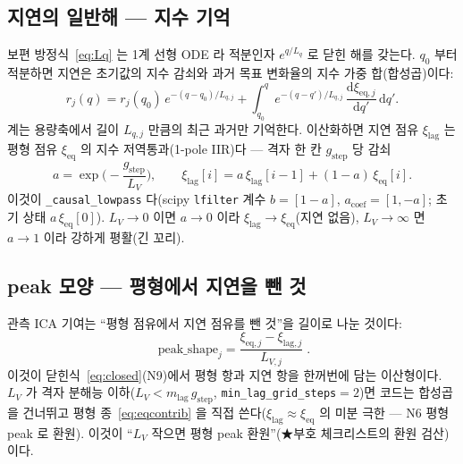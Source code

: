 \documentclass[11pt,a4paper]{article}
\newcommand{\dd}{\mathrm{d}}
\newcommand{\eq}{\mathrm{eq}}
\newcommand{\lag}{\mathrm{lag}}
\newcommand{\code}[1]{\texttt{#1}}
\begin{document}
\subsection{지연의 일반해 — 지수 기억}
보편 방정식~\eqref{eq:Lq} 는 1계 선형 ODE 라 적분인자 $e^{q/L_q}$ 로 닫힌 해를 갖는다. $q_0$ 부터 적분하면 지연은 초기값의 지수 감쇠와 과거 목표 변화율의 지수 가중 합(합성곱)이다:
\begin{equation}
r_j(q)=r_j(q_0)\,e^{-(q-q_0)/L_{q,j}}+\int_{q_0}^{q}e^{-(q-q')/L_{q,j}}\,\frac{\dd\xi_{\eq,j}}{\dd q'}\,\dd q'.
\label{eq:memory}
\end{equation}
계는 용량축에서 길이 $L_{q,j}$ 만큼의 최근 과거만 기억한다. 이산화하면 지연 점유 $\xi_\lag$ 는 평형 점유 $\xi_\eq$ 의 지수 저역통과(1-pole IIR)다 — 격자 한 칸 $g_\mathrm{step}$ 당 감쇠
\begin{equation}
a=\exp\!\Big(-\frac{g_\mathrm{step}}{L_V}\Big),\qquad
\xi_\lag[i]=a\,\xi_\lag[i-1]+(1-a)\,\xi_\eq[i].
\label{eq:lowpass}
\end{equation}
이것이 \code{\_causal\_lowpass} 다(scipy \code{lfilter} 계수 $b=[1-a]$, $a_\mathrm{coef}=[1,-a]$; 초기 상태 $a\,\xi_\eq[0]$). $L_V\to0$ 이면 $a\to0$ 이라 $\xi_\lag\to\xi_\eq$(지연 없음), $L_V\to\infty$ 면 $a\to1$ 이라 강하게 평활(긴 꼬리).

\subsection{peak 모양 — 평형에서 지연을 뺀 것}
관측 ICA 기여는 ``평형 점유에서 지연 점유를 뺀 것''을 길이로 나눈 것이다:
\begin{equation}
\boxed{\;\text{peak\_shape}_j=\frac{\xi_{\eq,j}-\xi_{\lag,j}}{L_{V,j}}\;.}
\label{eq:peakshape}
\end{equation}
이것이 닫힌식~\eqref{eq:closed}(N9)에서 평형 항과 지연 항을 한꺼번에 담는 이산형이다. $L_V$ 가 격자 분해능 이하($L_V<m_\lag\,g_\mathrm{step}$, \code{min\_lag\_grid\_steps}$=2$)면 코드는 합성곱을 건너뛰고 평형 종~\eqref{eq:eqcontrib} 을 직접 쓴다($\xi_\lag\approx\xi_\eq$ 의 미분 극한 — N6 평형 peak 로 환원). 이것이 ``$L_V$ 작으면 평형 peak 환원''(★부호 체크리스트의 환원 검산)이다.
\end{document}
